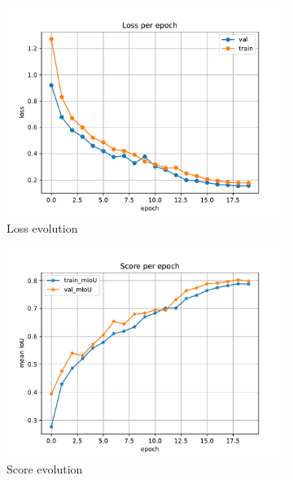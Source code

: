\documentclass[10pt, a4paper]{article}
\begin{document}
\begin{figure}[htpb]
  \centering
  \begin{subfigure}[b]{0.32\textwidth}
      \centering
      \includegraphics[width=\textwidth]{images/Patch128_scratch_loss.pdf}
      \caption{Loss evolution}
      \label{fig:q2c_loss}
  \end{subfigure}
  \hfill
  \begin{subfigure}[b]{0.32\textwidth}
    \centering
    \includegraphics[width=\textwidth]{images/Patch128_scratch_score.pdf}
    \caption{Score evolution}
    \label{fig:q2c_score}
  \end{subfigure}
  \hfill
  \begin{subfigure}[b]{0.32\textwidth}

\end{subfigure}
\end{figure}
\end{document}
